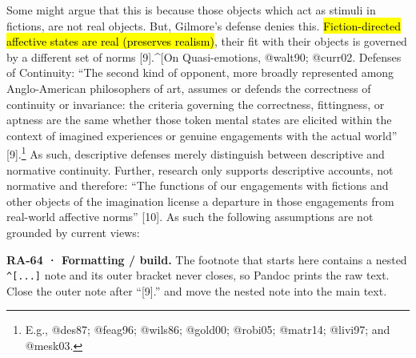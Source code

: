 \documentclass[
  letterpaper,
  DIV=11,
  numbers=noendperiod]{scrartcl}
\theoremstyle{remark}
\begin{document}
Some might argue that this is because those objects which act as stimuli
in fictions, are not real objects. But, Gilmore's defense denies this.
\hl{Fiction-directed affective states are real (preserves realism)},
their fit with their objects is governed by a different set of norms
{[}9{]}.\^{}{[}On Quasi-emotions, @walt90; @curr02. Defenses of
Continuity: ``The second kind of opponent, more broadly represented
among Anglo-American philosophers of art, assumes or defends the
correctness of continuity or invariance: the criteria governing the
correctness, fittingness, or aptness are the same whether those token
mental states are elicited within the context of imagined experiences or
genuine engagements with the actual world'' {[}9{]}.\footnote{E.g.,
  @des87; @feag96; @wils86; @gold00; @robi05; @matr14; @livi97; and
  @mesk03.} As such, descriptive defenses merely distinguish between
descriptive and normative continuity. Further, research only supports
descriptive accounts, not normative and therefore: ``The functions of
our engagements with fictions and other objects of the imagination
license a departure in those engagements from real-world affective
norms'' {[}10{]}. As such the following assumptions are not grounded by
current views:

\begin{tcolorbox}[enhanced jigsaw, arc=.35mm, bottomrule=.15mm, bottomtitle=1mm, breakable, colback=white, colbacktitle=quarto-callout-note-color!10!white, colframe=quarto-callout-note-color-frame, coltitle=black, left=2mm, leftrule=.75mm, opacityback=0, opacitybacktitle=0.6, rightrule=.15mm, title=\textcolor{quarto-callout-note-color}{\faInfo}\hspace{0.5em}{Note}, titlerule=0mm, toprule=.15mm, toptitle=1mm]

\textbf{RA-64 · Formatting / build.} The footnote that starts here
contains a nested \texttt{\^{}{[}...{]}} note and its outer bracket
never closes, so Pandoc prints the raw text. Close the outer note after
``{[}9{]}.'' and move the nested note into the main text.

\end{tcolorbox}
\end{document}

